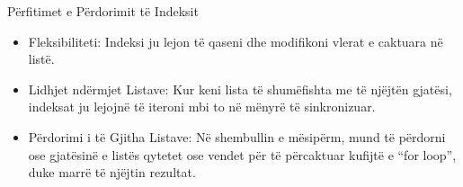 \documentclass[
  ignorenonframetext,
]{beamer}
\begin{document}
\begin{frame}{Përfitimet e Përdorimit të Indeksit}
\protect\hypertarget{puxebrfitimet-e-puxebrdorimit-tuxeb-indeksit}{}
\begin{itemize}
\item
  Fleksibiliteti: Indeksi ju lejon të qaseni dhe modifikoni vlerat e
  caktuara në listë.
\item
  Lidhjet ndërmjet Listave: Kur keni lista të shumëfishta me të njëjtën
  gjatësi, indeksat ju lejojnë të iteroni mbi to në mënyrë të
  sinkronizuar.
\item
  Përdorimi i të Gjitha Listave: Në shembullin e mësipërm, mund të
  përdorni ose gjatësinë e listës qytetet ose vendet për të përcaktuar
  kufijtë e ``for loop'', duke marrë të njëjtin rezultat.
\end{itemize}
\end{frame}
\end{document}

